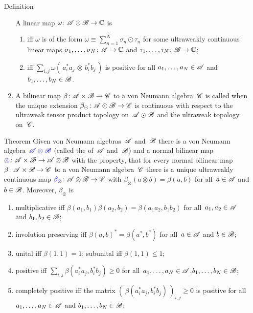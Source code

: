 \documentclass[a]{subfiles}
\begin{document}
\begin{parsec}
\begin{point}{Definition}
\begin{enumerate}
A linear map $\omega\colon \mathscr{A}\odot \mathscr{B}\to\mathbb{C}$
is 
\begin{enumerate}
\item
{}
iff $\omega$ is of the form $\omega \equiv \sum_{n=1}^N \sigma_n\odot\tau_n$
for some ultraweakly continuous linear maps 
$\sigma_1,\dotsc,\sigma_N\colon \mathscr{A}\to\mathbb{C}$ and 
$\tau_1,\dotsc,\tau_N\colon \mathscr{B}\to\mathbb{C}$;
\item
{}
iff $\sum_{i,j}\omega(\,a_i^*a_j\,\otimes\, b_i^*b_j\,)$
is positive 
for all $a_1,\dots,a_N\in\mathscr{A}$
and~$b_1,\dotsc,b_N\in\mathscr{B}$.
\end{enumerate}
\item
A bilinear map $\beta\colon \mathscr{A}\times \mathscr{B}\to\mathscr{C}$
to a von Neumann algebra~$\mathscr{C}$
is called 
when the unique extension $\beta_\odot \colon \mathscr{A}\odot \mathscr{B}\to \mathscr{C}$
is continuous with respect to the ultraweak tensor product topology 
on~$\mathscr{A}\odot\mathscr{B}$
and the ultraweak topology on~$\mathscr{C}$.
\end{enumerate}
\end{point}
\begin{point}{Theorem}%
Given von Neumann algebras~$\mathscr{A}$ and~$\mathscr{B}$
there is a von Neumann algebra~$\Define{\scrA\otimes\scrB}$
(called the  of~$\mathscr{A}$ and~$\mathscr{B}$)
and a normal
bilinear map $\Define{\otimes} \colon \scrA\times \scrB\to
\scrA\otimes \scrB$
with the property, that for every 
normal bilinear map $\beta\colon \mathscr{A}\times \mathscr{B}\to\mathscr{C}$
to a von Neumann algebra~$\mathscr{C}$
there is a unique ultraweakly continuous
map $\Define{\beta_\otimes}\colon \scrA\otimes \scrB
\to \scrC$ with $\beta_\otimes(a\otimes b) = \beta(a,b)$
for all~$a\in \mathscr{A}$ and $b\in\mathscr{B}$.
Moreover,
$\beta_\otimes$ is
\begin{enumerate}
\item
multiplicative
iff $\beta(a_1,b_1)\beta(a_2,b_2)=\beta(a_1a_2,b_1b_2)$
for all~$a_1,a_2\in\mathscr{A}$ and $b_1,b_2\in\mathscr{B}$;
\item
involution preserving
iff $\beta(a,b)^* = \beta(a^*,b^*)$ for all~$a\in\mathscr{A}$
and $b\in\mathscr{B}$;
\item
unital iff $\beta(1,1)=1$;
subunital iff $\beta(1,1)\leq 1$;
\item
positive iff 
$\sum_{i,j} \beta(a_i^*a_j,b_i^*b_j) \geq 0$
for all~$a_1,\dotsc,a_N\in\mathscr{A}$,$b_1,\dotsc,b_N\in\mathscr{B}$;
\item
completely positive iff 
the matrix $(\ \beta(a_i^*a_j,b_i^*b_j)\ )_{i,j}\geq 0$
is positive
for all~$a_1,\dotsc,a_N\in\mathscr{A}$
and $b_1,\dotsc,b_N\in\mathscr{B}$;

\end{enumerate}
\end{point}
\end{parsec}
\end{document}
